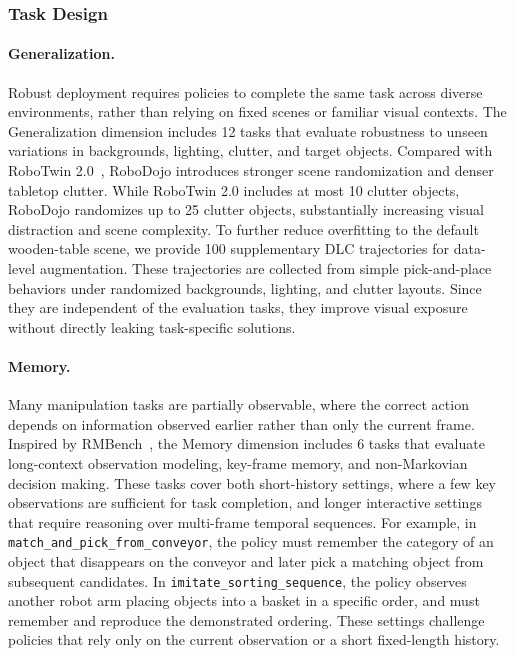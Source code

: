 \subsubsection{Task Design}

\paragraph{Generalization.}
Robust deployment requires policies to complete the same task across diverse environments, rather than relying on fixed scenes or familiar visual contexts. The Generalization dimension includes 12 tasks that evaluate robustness to unseen variations in backgrounds, lighting, clutter, and target objects. Compared with RoboTwin 2.0~\citep{chen2025robotwin}, RoboDojo introduces stronger scene randomization and denser tabletop clutter. While RoboTwin 2.0 includes at most 10 clutter objects, RoboDojo randomizes up to 25 clutter objects, substantially increasing visual distraction and scene complexity. To further reduce overfitting to the default wooden-table scene, we provide 100 supplementary DLC trajectories for data-level augmentation. These trajectories are collected from simple pick-and-place behaviors under randomized backgrounds, lighting, and clutter layouts. Since they are independent of the evaluation tasks, they improve visual exposure without directly leaking task-specific solutions.

\paragraph{Memory.}
Many manipulation tasks are partially observable, where the correct action depends on information observed earlier rather than only the current frame. Inspired by RMBench~\citep{chen2026rmbench}, the Memory dimension includes 6 tasks that evaluate long-context observation modeling, key-frame memory, and non-Markovian decision making. These tasks cover both short-history settings, where a few key observations are sufficient for task completion, and longer interactive settings that require reasoning over multi-frame temporal sequences. For example, in \texttt{match\_and\_pick\_from\_conveyor}, the policy must remember the category of an object that disappears on the conveyor and later pick a matching object from subsequent candidates. In \texttt{imitate\_sorting\_sequence}, the policy observes another robot arm placing objects into a basket in a specific order, and must remember and reproduce the demonstrated ordering. These settings challenge policies that rely only on the current observation or a short fixed-length history.

